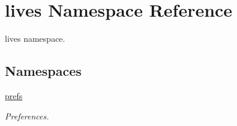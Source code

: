 \hypertarget{namespacelives}{\section{lives Namespace Reference}
\label{namespacelives}
}


lives namespace.  


\subsection*{Namespaces}
\begin{DoxyCompactItemize}
\item 
\hyperlink{namespacelives_1_1prefs}{prefs}
\begin{DoxyCompactList}\small\item\em Preferences. \end{DoxyCompactList}\end{DoxyCompactItemize}
